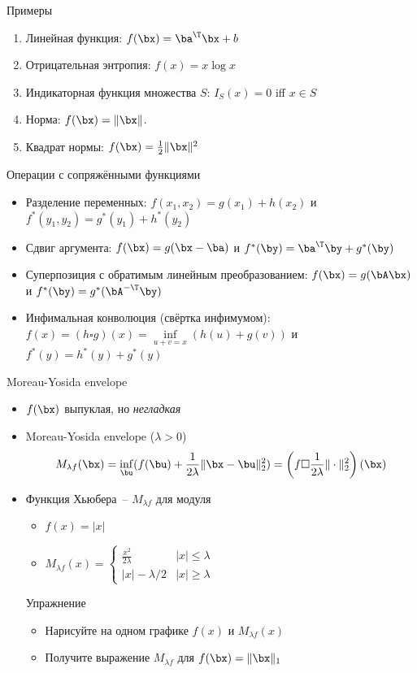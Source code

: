 \documentclass[12pt]{beamer}
\begin{document}
\begin{frame}{Примеры}
\begin{enumerate}
\item Линейная функция: $f(\bx) = \ba^{\T}\bx + b$
\item Отрицательная энтропия: $f(x) = x\log x$
\item Индикаторная функция множества $S$: $I_S(x) = 0$ iff $x \in S$
\item Норма: $f(\bx) = \|\bx\|$.
\item Квадрат нормы: $f(\bx) = \frac{1}{2}\|\bx\|^2$
\end{enumerate}
\end{frame}

\begin{frame}{Операции с сопряжёнными функциями}

\begin{itemize}
\item Разделение переменных: $f(x_1, x_2) = g(x_1) + h(x_2)$ и $f^*(y_1, y_2) = g^*(y_1) + h^*(y_2)$
\item Сдвиг аргумента: $f(\bx) = g(\bx - \ba)$ и $f^*(\by) = \ba^{\T}\by + g^*(\by)$
\item Суперпозиция с обратимым линейным преобразованием: $f(\bx) = g(\bA\bx)$ и $f^*(\by) = g^*(\bA^{-\T}\by)$
\item Инфимальная конволюция (свёртка инфимумом):  $f(x) = (h \square g)(x) = \inf\limits_{u + v = x} (h(u) + g(v))$ и $f^*(y) = h^*(y) + g^*(y)$
\end{itemize}

\end{frame}

\begin{frame}{Moreau-Yosida envelope}
\begin{itemize}
\item $f(\bx)$ выпуклая, но \emph{негладкая}
\item Moreau-Yosida envelope ($\lambda > 0$)
\[
M_{\lambda f}(\bx) = \inf\limits_{\bu} (f(\bu) + \frac{1}{2\lambda}\|\bx - \bu\|^2_2) = \left(f \square \frac{1}{2\lambda} \|\cdot\|_2^2\right)(\bx)
\]
\item Функция Хьюбера~-- $M_{\lambda f}$ для модуля
\begin{itemize}
\item $f(x) = |x|$
\item $M_{\lambda f}(x) = 
\begin{cases}
\frac{x^2}{2\lambda} & |x| \leq \lambda\\
|x| - \lambda / 2 & |x| \geq \lambda
\end{cases}$
\end{itemize}
\begin{block}{Упражнение}
\begin{itemize}
\item Нарисуйте на одном графике $f(x)$ и $M_{\lambda f}(x)$
\item Получите выражение $M_{\lambda f}$ для $f(\bx) = \|\bx\|_1$ 
\end{itemize}
\end{block}
\end{itemize}

\end{frame}
\end{document}
